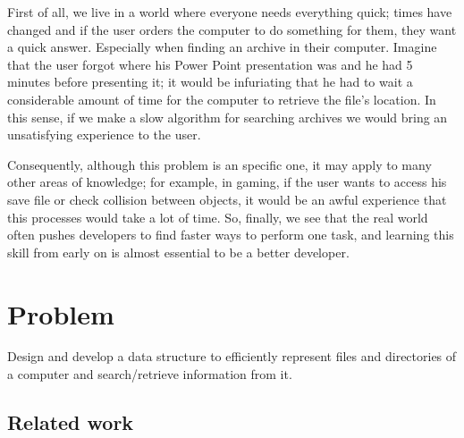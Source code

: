 \documentclass{sig-alternate-05-2015}
\begin{document}
    First of all, we live in a world where everyone needs everything quick; times have changed and if the user orders the computer
    to do something for them, they want a quick answer. Especially when finding an archive in their computer. Imagine that the
    user forgot where his Power Point presentation was and he had 5 minutes before presenting it; it would be infuriating that he
    had to wait a considerable amount of time for the computer to retrieve the file's location. In this sense, if we make a slow algorithm for searching
    archives we would bring an unsatisfying experience to the user.

    Consequently, although this problem is an specific one, it may apply to many other areas of knowledge; for example, in gaming,
    if the user wants to access his save file or check collision between objects, it would be an awful experience that this processes would take
    a lot of time. So, finally, we see that the real world often pushes developers to find faster ways to perform one task, and
    learning this skill from early on is almost essential to be a better developer.

  \section{Problem}
    Design and develop a data structure to efficiently represent files and directories of a computer and search/retrieve information from it.

  \subsection{Related work}
\end{document}
